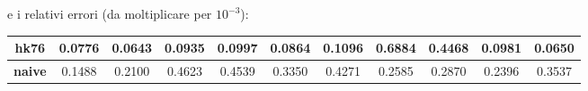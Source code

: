\vspace{15px}
\noindent
e i relativi errori (da moltiplicare per $10^{-3}$):

\vspace{15px}
\noindent
\begin{tabular}{|c|*{10}{c|}}
	\hline
	\textbf{hk76}  & 0.0776  &  0.0643 &   0.0935 &   0.0997&    0.0864  &  0.1096   & 0.6884  &  0.4468&    0.0981  &  0.0650\\
	\hline
	\textbf{naive}  & 0.1488  &  0.2100 &   0.4623  &  0.4539 &   0.3350  &  0.4271 &   0.2585  &  0.2870 &   0.2396 &   0.3537\\
	\hline
\end{tabular}

\vspace{15px}
\noindent